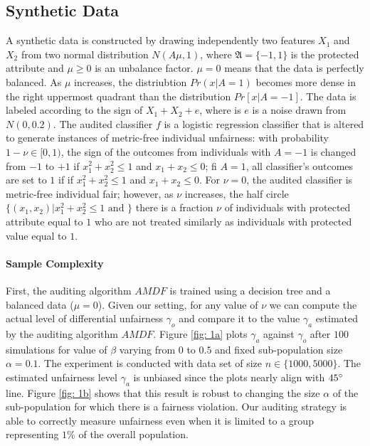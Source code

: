 \documentclass{article}
\begin{document}
\subsection{Synthetic Data}
A synthetic data is constructed by drawing independently two features $X_{1}$ and $X_{2}$ from two normal distribution $N(A\mu, 1)$, where  $\mathfrak{A}=\{-1, 1\}$ is the protected attribute and $\mu \geq 0$ is an unbalance factor. $\mu=0$ means that the data is perfectly balanced. As $\mu$ increases, the distriubtion $Pr(x|A=1)$ becomes more dense in the right uppermost quadrant than the distribution $Pr[x|A=-1]$. The data is labeled according to the sign of $X_{1} + X_{2} + e$, where is $e$ is a noise drawn from $N(0, 0.2)$. The audited classifier $f$ is a logistic regression classifier that is altered to generate instances of metric-free individual unfairness: with probability $1-\nu\in[0, 1)$, the sign of the outcomes from individuals with $A=-1$ is changed from $-1$ to $+1$ if $x^{2}_{1} + x^{2}_{2} \leq 1$ and $x_{1}+ x_{2} \leq 0$; fi $A=1$, all classifier's outcomes are set to $1$ if if $x^{2}_{1} + x^{2}_{2} \leq 1$ and $x_{1}+ x_{2} \leq 0$. For $\nu=0$, the audited classifier is metric-free individual fair; however, as $\nu$ increases, the half circle $\{(x_{1}, x_{2})|x^{2}_{1} + x^{2}_{2} \leq 1 \mbox{ and } \}$ there is a fraction $\nu$ of individuals with protected attribute equal to $1$ who are not treated similarly as individuals with protected value equal to $1$. 

\bigskip
\paragraph{Sample Complexity}
First, the auditing algorithm $AMDF$ is trained using a decision tree and a balanced data ($\mu=0$). Given our setting, for any value of $\nu$ we can compute the actual level of differential unfairness $\gamma_{o}$ and compare it to the value  $\gamma_{a}$ estimated by the auditing algorithm $AMDF$.  Figure \ref{fig: 1a} plots $\gamma_{a}$ against $\gamma_{o}$ after $100$ simulations for value of $\beta$ varying from $0$ to $0.5$ and fixed sub-population size $\alpha=0.1$. The experiment is conducted with data set of size $n\in \{1000, 5000\}$. The estimated unfairness level $\gamma_{a}$ is unbiased since the plots nearly align with $45\degree$ line. Figure \ref{fig: 1b} shows that this result is robust to changing the size $\alpha$ of the sub-population for which there is a fairness violation. Our auditing strategy is able to correctly measure unfairness even when it is limited to a group representing $1\%$ of the overall population. 
\end{document}
